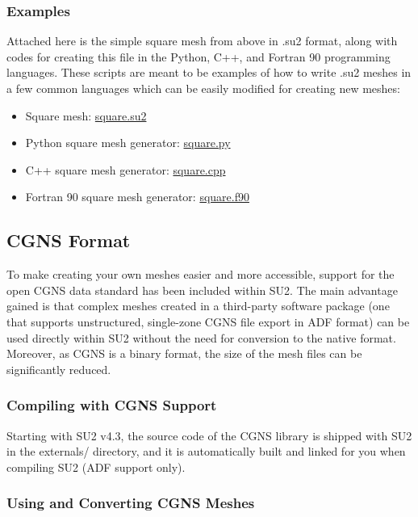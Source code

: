 \documentclass[12pt, a4paper, twoside]{article}
\begin{document}
\subsubsection{Examples}

Attached here is the simple square mesh from above in .su2 format, along with codes for creating this file in the Python, C++, and Fortran 90 programming languages. These scripts are meant to be examples of how to write .su2 meshes in a few common languages which can be easily modified for creating new meshes:

\begin{itemize}
    \item Square mesh: \href{run:./square.su2}{square.su2}
    \item Python square mesh generator: \href{run:./square.py}{square.py}
    \item C++ square mesh generator: \href{run:./square.cpp}{square.cpp}
    \item Fortran 90 square mesh generator: \href{run:./square.f90}{square.f90}
    
\end{itemize}
   

\subsection{CGNS Format}

To make creating your own meshes easier and more accessible, support for the open CGNS data standard has been included within SU2. The main advantage gained is that complex meshes created in a third-party software package (one that supports unstructured, single-zone CGNS file export in ADF format) can be used directly within SU2 without the need for conversion to the native format. Moreover, as CGNS is a binary format, the size of the mesh files can be significantly reduced.

\subsubsection{Compiling with CGNS Support}

Starting with SU2 v4.3, the source code of the CGNS library is shipped with SU2 in the externals/ directory, and it is automatically built and linked for you when compiling SU2 (ADF support only).


\subsubsection{Using and Converting CGNS Meshes}
\end{document}
